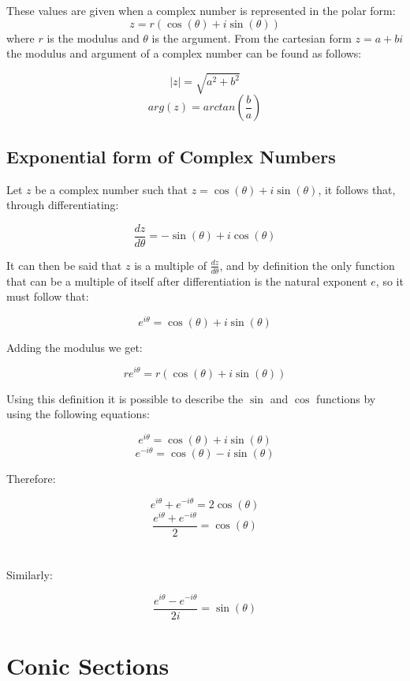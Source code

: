 \documentclass{article}
\begin{document}
These values are given when a complex number is represented in the polar form:
\[z=r\left(\cos\left(\theta\right) + i\sin\left(\theta\right)\right)\]
where \(r\) is the modulus and \(\theta\) is the argument. From the cartesian form \(z=a+bi\) the modulus and argument of a complex number can be found as follows:

\[|z|=\sqrt{a^2 + b^2}\]
\[arg\left(z\right) = arctan\left(\frac{b}{a}\right)\]

\subsection{Exponential form of Complex Numbers}

Let \(z\) be a complex number such that \(z=\cos\left(\theta\right) +i\sin\left(\theta\right)\), it follows that, through differentiating:

\[\frac{dz}{d\theta}=-\sin\left(\theta\right) +i\cos\left(\theta\right)\]

\noindent It can then be said that \(z\) is a multiple of \(\frac{dz}{d\theta}\), and by definition the only function that can be a multiple of itself after differentiation is the natural exponent \(e\), so it must follow that:

\[e^{i\theta}=\cos\left(\theta\right) +i\sin\left(\theta\right)\]

\noindent Adding the modulus we get:

\[re^{i\theta} = r(\cos\left(\theta\right) +i\sin\left(\theta\right))\]

\noindent Using this definition it is possible to describe the \(\sin\) and \(\cos\) functions by using the following equations:

\[e^{i\theta}= \cos\left(\theta\right)+i\sin\left(\theta\right)\]
\[e^{-i\theta}=\cos\left(\theta\right)-i\sin\left(\theta\right)\]

\noindent Therefore:

\[e^{i\theta}+e^{-i\theta}=2\cos\left(\theta\right)\]
\[\frac{e^{i\theta}+e^{-i\theta}}{2}=\cos\left(\theta\right)\] \\\\

Similarly:

\[\frac{e^{i\theta}-e^{-i\theta}}{2i}=\sin\left(\theta\right)\]

\section{Conic Sections}
\end{document}
